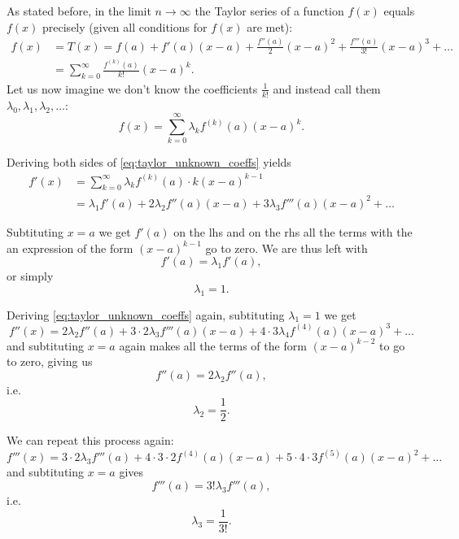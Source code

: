 As stated before, in the limit $n\to\infty$ the Taylor series of a function $f(x)$ equals $f(x)$ precisely (given all conditions for $f(x)$ are met):
\begin{align}
  f(x) & = T(x) = f(a) + f'(a)(x-a) + \frac{f''(a)}{2}(x-a)^{2} + \frac{f'''(a)}{3!}(x-a)^{3} + \dots\\
       &= \sum\limits_{k=0}^{\infty}\frac{f^{(k)}(a)}{k!}(x-a)^{k}.
  \label{eq:taylor_precise}
\end{align}
Let us now imagine we don't know the coefficients $\frac{1}{k!}$ and instead call them $\lambda_{0}, \lambda_{1}, \lambda_{2}, \dots$:
\begin{equation}
  f(x) = \sum\limits_{k=0}^{\infty}\lambda_{k}f^{(k)}(a)(x-a)^{k}.
  \label{eq:taylor_unknown_coeffs}
\end{equation}

Deriving both sides of \autoref{eq:taylor_unknown_coeffs} yields
\begin{align}
  f'(x) &= \sum\limits_{k=0}^{\infty}\lambda_{k}f^{(k)}(a)\cdot k(x-a)^{k-1}\\
        &= \lambda_{1}f'(a) + 2\lambda_{2}f''(a)(x-a) + 3\lambda_{3}f'''(a)(x-a)^{2} + \dots
  \label{eq:taylor_unknown_coeffs_1st_derivative}
\end{align}

Subtituting $x=a$ we get $f'(a)$ on the lhs and on the rhs all the terms with the an expression of the form $(x-a)^{k-1}$ go to zero. We are thus left with
\[
  f'(a) = \lambda_{1}f'(a),
\]
or simply
\begin{equation}
  \lambda_{1} = 1.
  \label{eq:Taylor_1st_coefficient}
\end{equation}

Deriving \autoref{eq:taylor_unknown_coeffs} again, subtituting $\lambda_{1}=1$ we get
\[
  f''(x) = 2\lambda_{2}f''(a) + 3\cdot2\lambda_{3}f'''(a)(x-a) + 4\cdot3\lambda_{4}f^{(4)}(a)(x-a)^{3} + \dots
\]
and subtituting $x=a$ again makes all the terms of the form $(x-a)^{k-2}$ to go to zero, giving us
\[
  f''(a) = 2\lambda_{2}f''(a),
\]
i.e.
\begin{equation}
  \lambda_{2} = \frac{1}{2}.
  \label{eq:Taylor_2nd_coefficient}
\end{equation}

We can repeat this process again:
\[
  f'''(x) = 3\cdot2\lambda_{3}f'''(a) + 4\cdot3\cdot2f^{(4)}(a)(x-a) + 5\cdot4\cdot3f^{(5)}(a)(x-a)^{2} + \dots
\]
and subtituting $x=a$ gives
\[
  f'''(a) = 3!\lambda_{3}f'''(a),
\]
i.e.
\begin{equation}
  \lambda_{3} = \frac{1}{3!}.
  \label{eq:Taylor_3rd_coefficient}
\end{equation}

